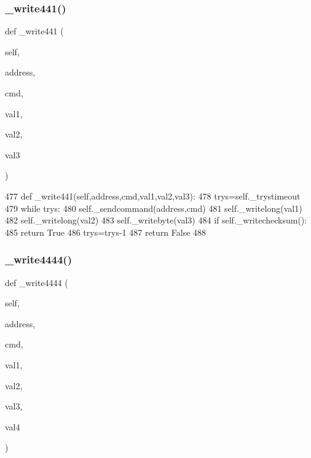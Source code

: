 \subsubsection{\texorpdfstring{\+\_\+write441()}{\_write441()}}
{\footnotesize\ttfamily def \+\_\+write441 (\begin{DoxyParamCaption}\item[{}]{self,  }\item[{}]{address,  }\item[{}]{cmd,  }\item[{}]{val1,  }\item[{}]{val2,  }\item[{}]{val3 }\end{DoxyParamCaption})\hspace{0.3cm}{\ttfamily [private]}}


\begin{DoxyCode}
477     \textcolor{keyword}{def }\_write441(self,address,cmd,val1,val2,val3):
478         trys=self.\_trystimeout
479         \textcolor{keywordflow}{while} trys:
480             self.\_sendcommand(address,cmd)
481             self.\_writelong(val1)
482             self.\_writelong(val2)
483             self.\_writebyte(val3)
484             \textcolor{keywordflow}{if} self.\_writechecksum():
485                 \textcolor{keywordflow}{return} \textcolor{keyword}{True}
486             trys=trys-1
487         \textcolor{keywordflow}{return} \textcolor{keyword}{False}
488 
\end{DoxyCode}
\mbox{\label{classtoxic__hardware_1_1roboclaw__3_1_1Roboclaw_a24d6c8ebb8ad82ebb15ca810cd9fdb07}} 
\subsubsection{\texorpdfstring{\+\_\+write4444()}{\_write4444()}}
{\footnotesize\ttfamily def \+\_\+write4444 (\begin{DoxyParamCaption}\item[{}]{self,  }\item[{}]{address,  }\item[{}]{cmd,  }\item[{}]{val1,  }\item[{}]{val2,  }\item[{}]{val3,  }\item[{}]{val4 }\end{DoxyParamCaption})\hspace{0.3cm}{\ttfamily [private]}}



